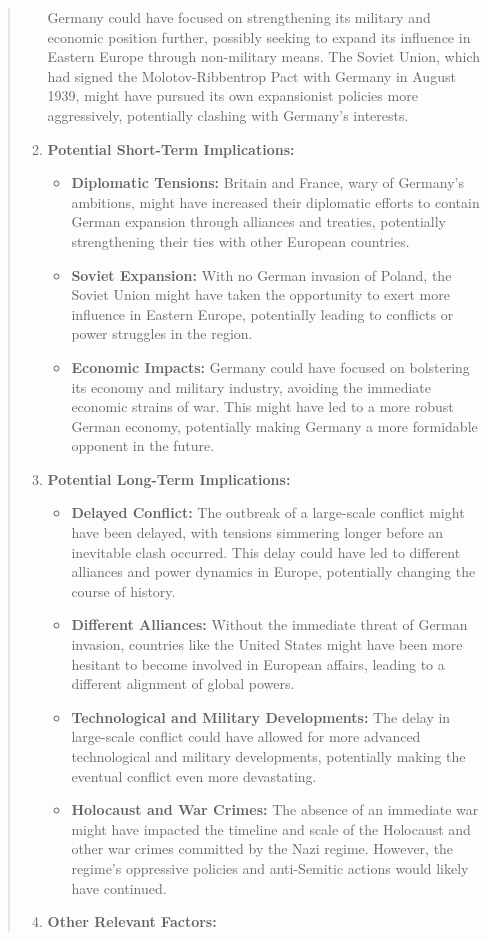 \documentclass[fleqn,10pt]{wlscirep}
\providecommand{\tightlist}{%
  \setlength{\itemsep}{0pt}\setlength{\parskip}{0pt}}
\begin{document}
\begin{quote}
\begin{enumerate}
  Germany could have focused on strengthening its military and economic
  position further, possibly seeking to expand its influence in Eastern
  Europe through non-military means. The Soviet Union, which had signed
  the Molotov-Ribbentrop Pact with Germany in August 1939, might have
  pursued its own expansionist policies more aggressively, potentially
  clashing with Germany's interests.
\item
  \textbf{Potential Short-Term Implications:}

  \begin{itemize}
  \tightlist
  \item
    \textbf{Diplomatic Tensions:} Britain and France, wary of Germany's
    ambitions, might have increased their diplomatic efforts to contain
    German expansion through alliances and treaties, potentially
    strengthening their ties with other European countries.
  \item
    \textbf{Soviet Expansion:} With no German invasion of Poland, the
    Soviet Union might have taken the opportunity to exert more
    influence in Eastern Europe, potentially leading to conflicts or
    power struggles in the region.
  \item
    \textbf{Economic Impacts:} Germany could have focused on bolstering
    its economy and military industry, avoiding the immediate economic
    strains of war. This might have led to a more robust German economy,
    potentially making Germany a more formidable opponent in the future.
  \end{itemize}
\item
  \textbf{Potential Long-Term Implications:}

  \begin{itemize}
  \tightlist
  \item
    \textbf{Delayed Conflict:} The outbreak of a large-scale conflict
    might have been delayed, with tensions simmering longer before an
    inevitable clash occurred. This delay could have led to different
    alliances and power dynamics in Europe, potentially changing the
    course of history.
  \item
    \textbf{Different Alliances:} Without the immediate threat of German
    invasion, countries like the United States might have been more
    hesitant to become involved in European affairs, leading to a
    different alignment of global powers.
  \item
    \textbf{Technological and Military Developments:} The delay in
    large-scale conflict could have allowed for more advanced
    technological and military developments, potentially making the
    eventual conflict even more devastating.
  \item
    \textbf{Holocaust and War Crimes:} The absence of an immediate war
    might have impacted the timeline and scale of the Holocaust and
    other war crimes committed by the Nazi regime. However, the regime's
    oppressive policies and anti-Semitic actions would likely have
    continued.
  \end{itemize}
\item
  \textbf{Other Relevant Factors:}


\end{enumerate}
\end{quote}
\end{document}
